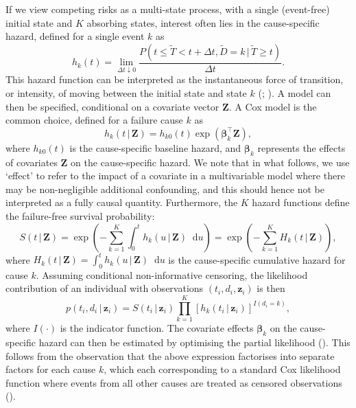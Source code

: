 \documentclass[
  letterpaper,
  paper=240mm:170mm,
  twoside=true,
  open=right,
  fontsize=10pt,
  pagesize=false,
  BCOR=15mm,
  DIV=14,
  headinclude=true,
  footinclude=false,
  headsepline=on]{scrbook}
\newcommand{\given}{\,|\,}
\newcommand\diff{\mathop{}\!\mathrm{d}}
\begin{document}
If we view competing risks as a multi-state process, with a single
(event-free) initial state and \(K\) absorbing states, interest often
lies in the cause-specific hazard, defined for a single event \(k\) as
\begin{equation*}
    h_k(t) = \lim_{\Delta t \downarrow 0} \frac{P(t \leq \tilde{T} < t + \Delta t, \tilde{D} = k \given \tilde{T} \geq t)}{\Delta t}.
\end{equation*} This hazard function can be interpreted as the
instantaneous force of transition, or intensity, of moving between the
initial state and state \(k\)
(;
). A model can then be specified, conditional on a covariate
vector \(\mathbf{Z}\). A Cox model is the common choice, defined for a
failure cause \(k\) as \begin{equation*}
    h_k(t \given \mathbf{Z}) = h_{k0}(t)\exp(\boldsymbol{\beta}_k^\intercal \mathbf{Z}),
\end{equation*} where \(h_{k0}(t)\) is the cause-specific baseline
hazard, and \(\boldsymbol{\beta}_k\) represents the effects of
covariates \(\mathbf{Z}\) on the cause-specific hazard. We note that in
what follows, we use `effect' to refer to the impact of a covariate in a
multivariable model where there may be non-negligible additional
confounding, and this should hence not be interpreted as a fully causal
quantity. Furthermore, the \(K\) hazard functions define the
failure-free survival probability: \begin{equation*}
    S(t \given \mathbf{Z}) = \exp \left( - \sum_{k = 1}^{K} \int_{0}^{t} h_k(u \given \mathbf{Z}) \diff u \right)
        = \exp \left( - \sum_{k = 1}^{K} H_k(t \given \mathbf{Z}) \right),
\end{equation*} where
\(H_k(t \given \mathbf{Z}) = \int_{0}^{t} h_k(u \given \mathbf{Z}) \diff u\)
is the cause-specific cumulative hazard for cause \(k\). Assuming
conditional non-informative censoring, the likelihood contribution of an
individual with observations \((t_i, d_i, \mathbf{z}_i)\) is then
\begin{equation}
    \label{eq:likelihood}
    p(t_i, d_i \given \mathbf{z}_i) = S(t_i \given \mathbf{z}_i) \prod_{k=1}^{K} \left[ h_k(t_i \given \mathbf{z}_i) \right]^{I(d_i=k)},
\end{equation} where \(I(\cdot)\) is the indicator function. The
covariate effects \(\boldsymbol{\beta}_k\) on the cause-specific hazard
can then be estimated by optimising the partial likelihood
(). This follows from
the observation that the above expression factorises into separate
factors for each cause \(k\), which each corresponding to a standard Cox
likelihood function where events from all other causes are treated as
censored observations
().
\end{document}
